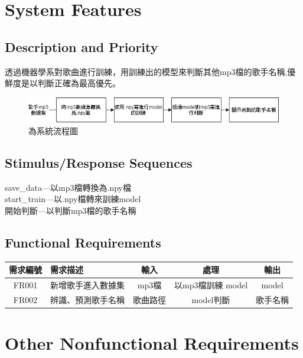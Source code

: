 \documentclass{article}
\begin{document}
\begin{CJK}{UTF8}{bkai}
\section{\huge\bf \color{blue}  System Features }
\subsection{\Large Description and Priority }
	
	透過機器學系對歌曲進行訓練，用訓練出的模型來判斷其他mp3檔的歌手名稱,優鮮度是以判斷正確為最高優先。
\begin{figure}[h]
\begin{center}
\includegraphics[width=14cm]{FS.jpg}
\end{center}
\caption{為系統流程圖}
\label{fig:2}
\end{figure}

\subsection{\Large Stimulus/Response Sequences}
	save\_data---以mp3檔轉換為.npy檔\\
	start\_train---以.npy檔轉來訓練model\\
	開始判斷---以判斷mp3檔的歌手名稱\\
	
\subsection{ \Large Functional Requirements}
 \begin{center}
	\begin{tabular}{|c|p{5cm}|c|c|c|}\hline
		需求編號 &  需求描述&輸入&處理&輸出 \\ \hline
		FR001 &  新增歌手進入數據集&mp3檔&以mp3檔訓練 model&model \\ \hline
		FR002 &  辨識、預測歌手名稱&歌曲路徑&model判斷&歌手名稱\\\hline
	\end{tabular}
\end{center}

\section{\huge\bf  \color {blue}  Other Nonfunctional Requirements }

\end{CJK}
\end{document}
